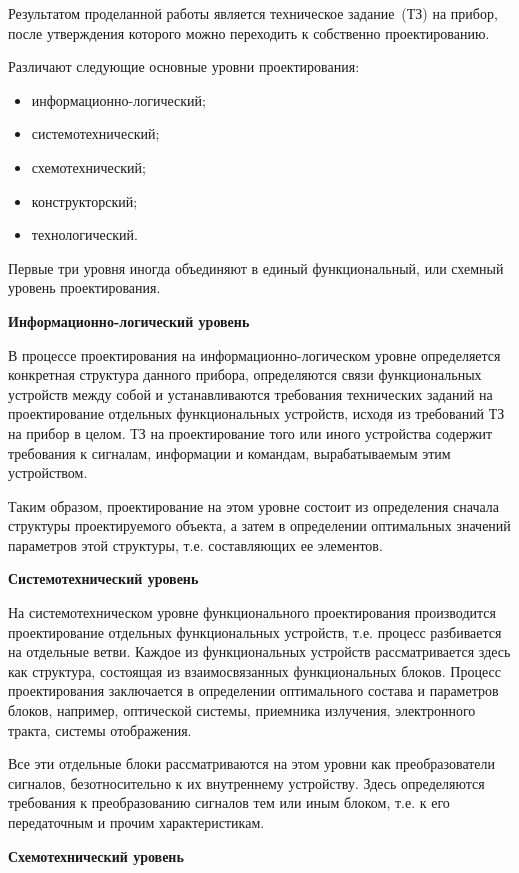 Результатом проделанной работы является техническое задание~(ТЗ) на прибор, после утверждения которого можно переходить к собственно проектированию.

\newpage
Различают следующие основные уровни проектирования:
\begin{itemize}
	\item информационно-логический;
	\item системотехнический;
	\item схемотехнический;
	\item конструкторский;
	\item технологический.
\end{itemize}

Первые три уровня иногда объединяют в единый функциональный, или схемный уровень проектирования.
\begin{flushleft}
	\textbf{Информационно-логический уровень}
\end{flushleft}

В процессе проектирования на информационно-логическом уровне определяется конкретная структура данного прибора, определяются связи функциональных устройств между собой и устанавливаются требования технических заданий на проектирование отдельных функциональных устройств, исходя из требований ТЗ на прибор в целом. ТЗ на проектирование того или иного устройства содержит требования к сигналам, информации и командам, вырабатываемым этим устройством.

Таким образом, проектирование на этом уровне состоит из определения сначала структуры проектируемого объекта, а затем в определении оптимальных значений параметров этой структуры, т.е. составляющих ее элементов.

\begin{flushleft}
	\textbf{Системотехнический уровень}
\end{flushleft}

На системотехническом уровне функционального проектирования производится проектирование отдельных функциональных устройств, т.е. процесс разбивается на отдельные ветви. Каждое из функциональных устройств рассматривается здесь как структура, состоящая из взаимосвязанных функциональных блоков. Процесс проектирования заключается в определении оптимального состава и параметров блоков, например, оптической системы, приемника излучения, электронного тракта, системы отображения.

Все эти отдельные блоки рассматриваются на этом уровни как преобразователи сигналов, безотносительно к их внутреннему устройству. Здесь определяются требования к преобразованию сигналов тем или иным блоком, т.е. к его передаточным и прочим характеристикам.
\begin{flushleft}
	\textbf{Схемотехнический уровень}
\end{flushleft}

